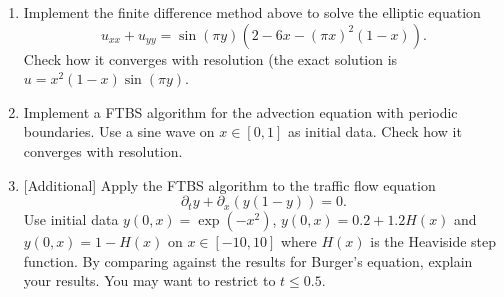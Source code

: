 \documentclass[10pt]{article}
\begin{document}
\begin{enumerate}
\item Implement the finite difference method above to solve the
  elliptic equation
  \begin{equation*}
    u_{xx} + u_{yy} = \sin ( \pi y ) \left( 2 - 6 x - (\pi x)^2 (1 -
      x) \right).
  \end{equation*}
  Check how it converges with resolution (the exact solution is $u =
  x^2 (1 - x) \sin(\pi y)$.
\item Implement a FTBS algorithm for the advection equation with
  periodic boundaries. Use a sine wave on $x \in [0,1]$ as initial
  data. Check how it converges with resolution.
\item{} [Additional] Apply the FTBS algorithm to the traffic flow equation
  \begin{equation*}
    \partial_t y + \partial_x \left( y ( 1 - y) \right) = 0.
  \end{equation*}
  Use initial data $y(0, x) = \exp(-x^2)$, $y(0, x) = 0.2 + 1.2 H(x)$
  and $y(0, x) = 1 - H(x)$ on $x \in [-10, 10]$ where $H(x)$ is the
  Heaviside step function. By comparing against the results for
  Burger's equation, explain your results. You may want to restrict to
  $t \leq 0.5$.
\end{enumerate}
\end{document}
